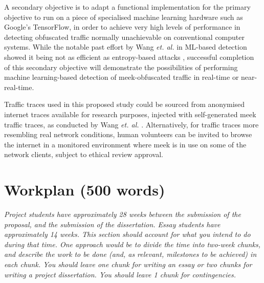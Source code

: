\documentclass[11pt]{article}
\begin{document}
A secondary objective is to adapt a functional implementation for the primary objective to run on a piece of specialised machine learning hardware such as Google's TensorFlow, in order to achieve very high levels of performance in detecting obfuscated traffic normally unachievable on conventional computer systems. While the notable past effort by Wang \emph{et. al.} in ML-based detection showed it being not as efficient as entropy-based attacks \cite[Sec. 8]{wang2015seeing}, successful completion of this secondary objective will demonstrate the possibilities of performing machine learning-based detection of meek-obfuscated traffic in real-time or near-real-time.

Traffic traces used in this proposed study could be sourced from anonymised internet traces available for research purposes, injected with self-generated meek traffic traces, as conducted by Wang \emph{et. al.} \cite[Sec. 3]{wang2015seeing}. Alternatively, for traffic traces more resembling real network conditions, human volunteers can be invited to browse the internet in a monitored environment where meek is in use on some of the network clients, subject to ethical review approval.



\section{Workplan (500 words)}
\textsl{Project students have approximately 28 weeks between the submission of 
the proposal, and the submission of the dissertation. Essay students have 
approximately 14 weeks.  This section
should account for what you intend to do during that time. One
approach would be to divide the time into two-week chunks, and 
describe the work to be done (and, as relevant, milestones to be 
achieved) in each chunk. You should leave one chunk for writing an essay or two 
chunks for writing a project dissertation. You should leave 1 chunk for contingencies.} 


\footnotesize{}

\newpage
\appendix
\end{document}
